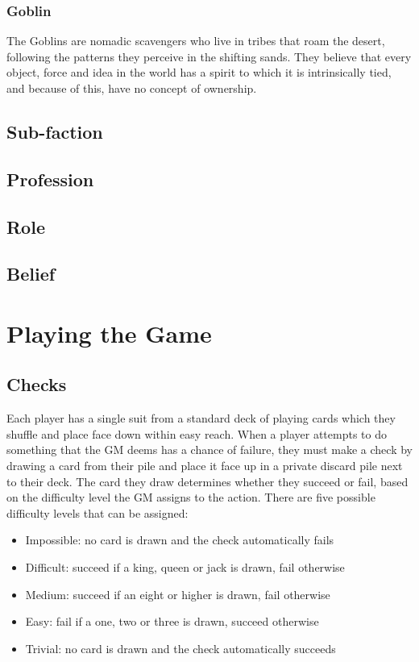 \documentclass{report}
\begin{document}
\subsection{Goblin}
The Goblins are nomadic scavengers who live in tribes that roam the desert, following the patterns they perceive in the
shifting sands. They believe that every object, force and idea in the world has a spirit to which it is intrinsically tied,
and because of this, have no concept of ownership.

\section{Sub-faction}

\section{Profession}

\section{Role}

\section{Belief}

\chapter{Playing the Game}
\section{Checks}
Each player has a single suit from a standard deck of playing cards which they shuffle and place face down within easy
reach. When a player attempts to do something that the GM deems has a chance of failure, they must make a check by drawing
a card from their pile and place it face up in a private discard pile next to their deck. The card they draw determines
whether they succeed or fail, based on the difficulty level the GM assigns to the action. There are five possible
difficulty levels that can be assigned:
\begin{itemize}
  \item Impossible: no card is drawn and the check automatically fails
  \item Difficult: succeed if a king, queen or jack is drawn, fail otherwise
  \item Medium: succeed if an eight or higher is drawn, fail otherwise
  \item Easy: fail if a one, two or three is drawn, succeed otherwise
  \item Trivial: no card is drawn and the check automatically succeeds
\end{itemize}
\end{document}
